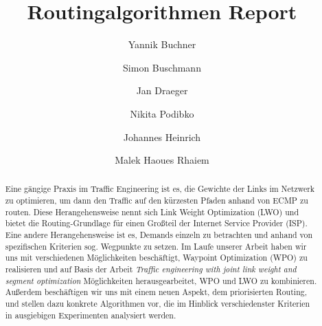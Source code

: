 \documentclass[sigconf,nonacm,review,language=english,language=german]{acmart}
\begin{document}
\title{Routingalgorithmen Report}

\author{Yannik Buchner}

\author{Simon Buschmann}

\author{Jan Draeger}

\author{Nikita Podibko}

\author{Johannes Heinrich}

\author{Malek Haoues Rhaiem}



\renewcommand{\shortauthors}{Buchner et al.}

\begin{abstract}
Eine gängige Praxis im Traffic Engineering ist es, die Gewichte der Links im Netzwerk zu optimieren, um dann den Traffic auf den kürzesten Pfaden anhand von ECMP zu routen. Diese Herangehensweise nennt sich Link Weight Optimization (LWO) und bietet die Routing-Grundlage für einen Großteil der Internet Service Provider (ISP). Eine andere Herangehensweise ist es, Demands einzeln zu betrachten und anhand von spezifischen Kriterien sog. Wegpunkte zu setzen. Im Laufe unserer Arbeit haben wir uns mit verschiedenen Möglichkeiten beschäftigt, Waypoint Optimization (WPO) zu realisieren und auf Basis der Arbeit \textit{Traffic engineering with joint link weight and segment optimization} \cite{parham2021traffic} Möglichkeiten herausgearbeitet, WPO und LWO zu kombinieren. Außerdem beschäftigen wir uns mit einem neuen Aspekt, dem priorisierten Routing, und stellen dazu konkrete Algorithmen vor, die im Hinblick verschiedenster Kriterien in ausgiebigen Experimenten analysiert werden.
\end{abstract}
\end{document}

